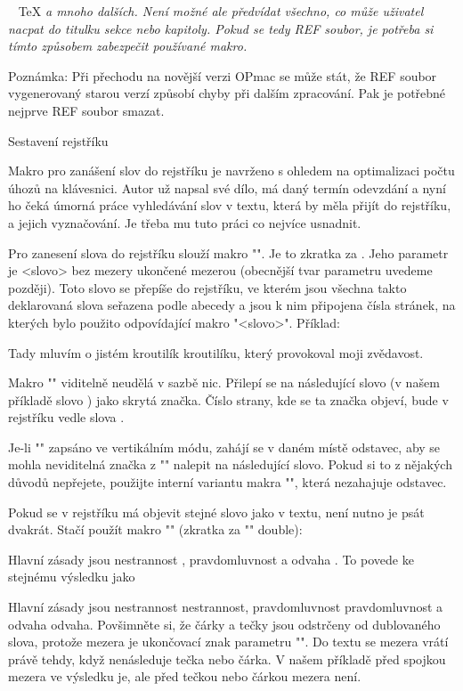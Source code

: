 \begtt
\addprotect~ \addprotect\TeX \addprotect\thefontsize \addprotect\em
\endtt 
%
a mnoho dalších. Není možné ale předvídat všechno, co může uživatel
nacpat do titulku sekce nebo kapitoly. Pokud se tedy 
REF soubor, je potřeba si tímto způsobem zabezpečit používané makro.

Poznámka: Při přechodu na novější verzi OPmac se může stát, že REF soubor
vygenerovaný starou verzí způsobí chyby při dalším zpracování. Pak je
potřebné nejprve REF soubor smazat.


\sec Sestavení rejstříku

Makro pro zanášení slov do rejstříku je navrženo s ohledem na optimalizaci
počtu úhozů na klávesnici. Autor už napsal své dílo, má daný termín
odevzdání a nyní ho čeká úmorná práce vyhledávání slov v textu, která by
měla přijít do rejstříku, a jejich vyznačování. Je třeba mu tuto práci co
nejvíce usnadnit.

Pro zanesení slova do rejstříku slouží makro "\ii". Je to zkratka za
.
Jeho parametr je <slovo> bez mezery ukončené mezerou (obecnější tvar parametru
uvedeme později). Toto slovo se přepíše do rejstříku, ve kterém jsou všechna
takto deklarovaná slova seřazena podle abecedy a jsou k nim připojena čísla
stránek, na kterých bylo použito odpovídající makro "\ii <slovo>". 
Příklad:

\begtt
Tady mluvím o jistém
\ii kroutilík
kroutilíku, který provokoval moji zvědavost.
\endtt

Makro "\ii" viditelně neudělá v sazbě nic. Přilepí se na následující slovo (v
našem příkladě slovo ) jako skrytá značka. Číslo strany,
kde se ta značka objeví, bude v rejstříku vedle slova .

Je-li "\ii" zapsáno ve vertikálním módu, zahájí se v daném místě odstavec,
aby se mohla neviditelná značka z "\ii" nalepit na následující slovo. Pokud
si to z nějakých důvodů nepřejete, použijte interní variantu makra
"", která nezahajuje odstavec.

Pokud se v rejstříku má objevit stejné slovo jako v textu, není nutno je psát
dvakrát. Stačí použít makro "\iid" (zkratka za "\ii" double):

\begtt
Hlavní zásady jsou \iid nestrannost , \iid pravdomluvnost a \iid odvaha .
\endtt
%
To povede ke stejnému výsledku jako

\begtt
Hlavní zásady jsou \ii nestrannost nestrannost,
\ii pravdomluvnost pravdomluvnost a \ii odvaha odvaha.
\endtt
%
Povšimněte si, že čárky a tečky jsou odstrčeny od dublovaného slova, protože
mezera je ukončovací znak parametru "\iid". Do textu se mezera vrátí právě
tehdy, když nenásleduje tečka nebo čárka. V našem příkladě před spojkou 
mezera ve výsledku je, ale před tečkou nebo čárkou mezera není.

